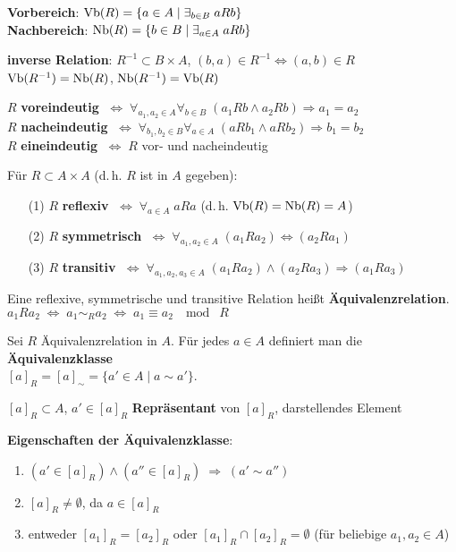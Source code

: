 \textbf{Vorbereich}:
$\operatorname{Vb}(R) = \{a \in A \;|\; \exists_{b \in B}\; a R b\}$ \\
\textbf{Nachbereich}:
$\operatorname{Nb}(R) = \{b \in B \;|\; \exists_{a \in A}\; a R b\}$

\textbf{inverse Relation}: $R^{-1} \subset B \times A$,
$(b,a) \in R^{-1} \Leftrightarrow (a,b) \in R$ \\
$\operatorname{Vb}(R^{-1}) = \operatorname{Nb}(R)$, $\operatorname{Nb}(R^{-1}) = \operatorname{Vb}(R)$

$R$ \textbf{voreindeutig}
$\;\Leftrightarrow\; \forall_{a_1,a_2 \in A} \forall_{b \in B}\;
(a_1 R b \land a_2 R b) \Rightarrow a_1 = a_2$ \\
$R$ \textbf{nacheindeutig}
$\;\Leftrightarrow\; \forall_{b_1,b_2 \in B} \forall_{a \in A}\;
(a R b_1 \land a R b_2) \Rightarrow b_1 = b_2$ \\
$R$ \textbf{eineindeutig} $\;\Leftrightarrow\; R$
vor- und nacheindeutig

\linie

Für $R \subset A \times A$ (d.\,h. $R$ ist in $A$ gegeben):

\begin{itemize}
    \item[(1)] $R$ \textbf{reflexiv} $\;\Leftrightarrow\;
    \forall_{a \in A}\; a R a$ (d.\,h. $\operatorname{Vb}(R) = \operatorname{Nb}(R) = A$)

    \item[(2)] $R$ \textbf{symmetrisch} $\;\Leftrightarrow\;
    \forall_{a_1,a_2 \in A}\; (a_1 R a_2) \Leftrightarrow (a_2 R a_1)$

    \item[(3)] $R$ \textbf{transitiv} $\;\Leftrightarrow\;
    \forall_{a_1,a_2,a_3 \in A}\;
    (a_1 R a_2) \land (a_2 R a_3) \Rightarrow (a_1 R a_3)$
\end{itemize}

Eine reflexive, symmetrische und transitive Relation heißt
\textbf{Äquivalenzrelation}. \\
$a_1 R a_2 \;\Leftrightarrow\; a_1 \sim_R a_2 \;\Leftrightarrow\;
a_1 \equiv a_2 \; \mod \; R$

Sei $R$ Äquivalenzrelation in $A$. Für jedes $a \in A$ definiert man die
\textbf{Äquivalenzklasse} \\
$[a]_R = [a]_\sim = \{a' \in A \;|\; a \sim a'\}$.

$[a]_R \subset A$, $a' \in [a]_R$ \textbf{Repräsentant} von $[a]_R$,
darstellendes Element

\textbf{Eigenschaften der Äquivalenzklasse}:

\begin{enumerate}
    \item $(a' \in [a]_R) \land (a'' \in [a]_R) \;\Rightarrow\; (a' \sim a'')$

    \item $[a]_R \not= \emptyset$, da $a \in [a]_R$

    \item entweder $[a_1]_R = [a_2]_R$ oder $[a_1]_R \cap [a_2]_R = \emptyset$
    (für beliebige $a_1, a_2 \in A$)
\end{enumerate}

